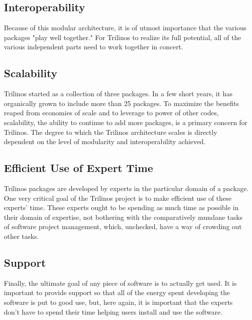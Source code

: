 \documentclass[12pt,relax]{article}
\begin{document}
\subsection{Interoperability}
Because of this modular architecture, it is of utmost importance that the
various packages "play well together."  For Trilinos to realize its full
potential, all of the various independent parts need to work together in
concert.

\subsection{Scalability}
Trilinos started as a collection of three packages.  In a few short years, it
has organically grown to include more than 25 packages.  To maximize the
benefits reaped from economies of scale and to leverage to power of other
codes, scalability, the ability to continue to add more packages, is a primary
concern for Trilinos.  The degree to which the Trilinos architecture scales
is directly dependent on the level of modularity and interoperability achieved.

\subsection{Efficient Use of Expert Time}
Trilinos packages are developed by experts in the particular domain of a
package.  One very critical goal of the Trilinos project is to make efficient
use of these experts' time.  These experts ought to be spending as much time as
possible in their domain of expertise, not bothering with the comparatively
mundane tasks of software project management, which, unchecked, have a way of
crowding out other tasks.

\subsection{Support}
Finally, the ultimate goal of any piece of software is to actually get used.  
It is important to provide support so that all of the energy spent developing
the software is put to good use, but, here again, it is important that the
experts don't have to spend their time helping users install and use the
software.

\clearpage

\end{document}
